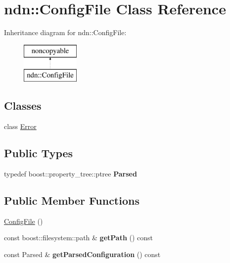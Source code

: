 \hypertarget{classndn_1_1ConfigFile}{}\section{ndn\+:\+:Config\+File Class Reference}
\label{classndn_1_1ConfigFile}
Inheritance diagram for ndn\+:\+:Config\+File\+:\begin{figure}[H]
\begin{center}
\leavevmode
\includegraphics[height=2.000000cm]{classndn_1_1ConfigFile}
\end{center}
\end{figure}
\subsection*{Classes}
\begin{DoxyCompactItemize}
\item 
class \hyperlink{classndn_1_1ConfigFile_1_1Error}{Error}
\end{DoxyCompactItemize}
\subsection*{Public Types}
\begin{DoxyCompactItemize}
\item 
typedef boost\+::property\+\_\+tree\+::ptree {\bfseries Parsed}\hypertarget{classndn_1_1ConfigFile_acf69505022c9ad2c60bc38d868eb804b}{}\label{classndn_1_1ConfigFile_acf69505022c9ad2c60bc38d868eb804b}

\end{DoxyCompactItemize}
\subsection*{Public Member Functions}
\begin{DoxyCompactItemize}
\item 
\hyperlink{classndn_1_1ConfigFile_a2ccc4dda78254e0168475456c27851a2}{Config\+File} ()
\item 
const boost\+::filesystem\+::path \& {\bfseries get\+Path} () const\hypertarget{classndn_1_1ConfigFile_a845d249ce6082632be8325bb3b27bad6}{}\label{classndn_1_1ConfigFile_a845d249ce6082632be8325bb3b27bad6}

\item 
const Parsed \& {\bfseries get\+Parsed\+Configuration} () const\hypertarget{classndn_1_1ConfigFile_a590aa4232c2cfa3fb8c6860192dfece2}{}\label{classndn_1_1ConfigFile_a590aa4232c2cfa3fb8c6860192dfece2}

\end{DoxyCompactItemize}


